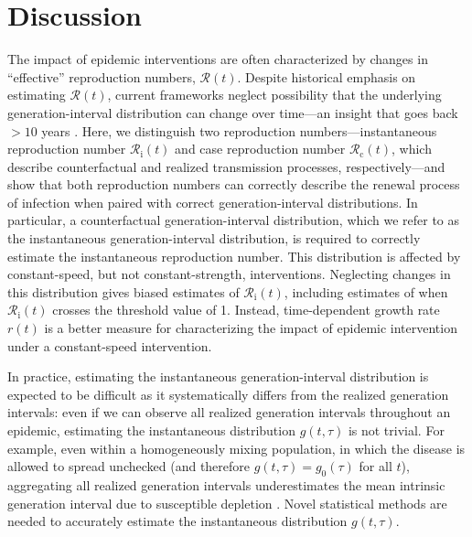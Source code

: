 \documentclass[12pt]{article}
\newcommand{\Rx}[1]{\ensuremath{{\mathcal R}_{#1}}\xspace}
\newcommand{\Rc}{\Rx{\mathrm{c}}}
\newcommand{\Ri}{\Rx{\mathrm{i}}}
\newcommand{\RR}{\ensuremath{{\mathcal R}}\xspace}
\begin{document}
\section{Discussion}

The impact of epidemic interventions are often characterized by changes in ``effective'' reproduction numbers, $\RR(t)$.
Despite historical emphasis on estimating $\RR(t)$, current frameworks neglect possibility that the underlying generation-interval distribution can change over time---an insight that goes back $>10$ years \citep{fraser2007estimating}.
Here, we distinguish two reproduction numbers---instantaneous reproduction number $\Ri(t)$ and case reproduction number $\Rc(t)$, which describe counterfactual and realized transmission processes, respectively---and show that both reproduction numbers can correctly describe the renewal process of infection when paired with correct generation-interval distributions.
In particular, a counterfactual generation-interval distribution, which we refer to as the instantaneous generation-interval distribution, is required to correctly estimate the instantaneous reproduction number. 
This distribution is affected by constant-speed, but not constant-strength, interventions.
Neglecting changes in this distribution gives biased estimates of $\Ri(t)$, including estimates of when $\Ri(t)$ crosses the threshold value of 1.
Instead, time-dependent growth rate $r(t)$ is a better measure for characterizing the impact of epidemic intervention under a constant-speed intervention.

In practice, estimating the instantaneous generation-interval distribution is expected to be difficult as it systematically differs from the realized generation intervals: even if we can observe all realized generation intervals throughout an epidemic, estimating the instantaneous distribution $g(t, \tau)$ is not trivial.
For example, even within a homogeneously mixing population, in which the disease is allowed to spread unchecked (and therefore $g(t, \tau) = g_0(\tau)$ for all $t$), aggregating all realized generation intervals underestimates the mean intrinsic generation interval due to susceptible depletion \citep{park2020inferring}.
Novel statistical methods are needed to accurately estimate the instantaneous distribution $g(t, \tau)$.
\end{document}
